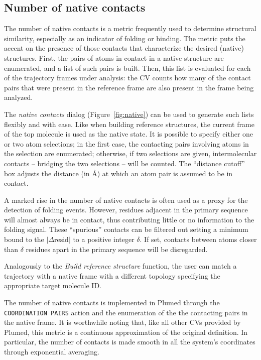 \documentclass[preprint,12pt]{elsarticle}
\begin{document}
\subsection{Number of native contacts}

The number of native contacts is a metric  frequently used to
determine structural similarity, especially as an indicator of folding
or binding.  The metric puts the accent on the presence of those
contacts that characterize the desired (native) structures. First, the
pairs of atoms in contact in a native structure are
enumerated, and a list of such pairs is built. Then, this list is evaluated
for each of the trajectory frames under analysis: the 
CV counts how many of the contact pairs that were present in the
reference frame are also present in the frame being analyzed.  

The \emph{native contacts} dialog (Figure~\ref{fig:native}) can be
used to generate such lists flexibly and with ease. Like when building
reference structures, the current frame of the top molecule is used as
the native state.  It is possible to specify either one or two atom
selections; in the first case, the contacting pairs involving atoms in
the selection are enumerated; otherwise, if two selections are given,
intermolecular contacts -- bridging the two selections -- will be
counted.  The ``distance cutoff'' box adjusts the distance (in \AA) at
which an atom pair is assumed to be in contact.

A marked rise in the number of native contacts is often used as a
proxy for the detection of folding events. However, residues adjacent
in the primary sequence will almost always be in contact, thus
contributing little or no information to the folding signal. These
``spurious'' contacts can be filtered out setting a minimum bound to
the $| \Delta \mbox{resid} |$ to a positive integer $\delta$. If set,
contacts between atoms closer than $\delta$ residues apart in the
primary sequence will be disregarded.

Analogously to the \emph{Build reference structure} function, the user
can match a trajectory with a native frame with a different topology
specifying the appropriate target molecule ID.

The number of native contacts is implemented in Plumed through the
\texttt{COORDINATION PAIRS} action and the enumeration of the  
the contacting pairs in the native frame. 
It is worthwhile noting that, like all other CVs provided by Plumed,
this metric is a continuous approximation of the original
definition. In particular, the number of contacts is made smooth in
all the system's coordinates through exponential averaging.
\end{document}

